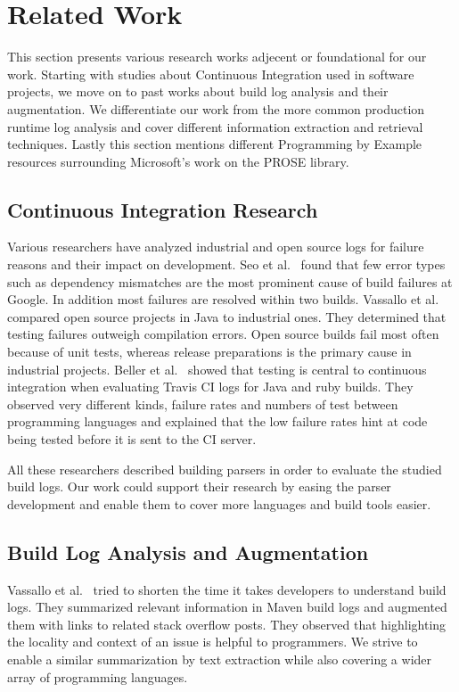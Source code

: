 \documentclass[\myrootdir/main.tex]{subfiles}
\begin{document}
\chapter{Related Work}
This section presents various research works adjecent or foundational for our work. Starting with studies about Continuous Integration used in software projects, we move on to past works about build log analysis and their augmentation. We differentiate our work from the more common production runtime log analysis and cover different information extraction and retrieval techniques. Lastly this section mentions different Programming by Example resources surrounding Microsoft's work on the PROSE library.

\section{Continuous Integration Research}
Various researchers have analyzed industrial and open source logs for failure reasons and their impact on development. Seo et al.~\cite{seo2014programmers} found that few error types such as dependency mismatches are the most prominent cause of build failures at Google. In addition most failures are resolved within two builds. Vassallo et al.~\cite{vassallo2017a-tale} compared open source projects in Java to industrial ones. They determined that testing failures outweigh compilation errors. Open source builds fail most often because of unit tests, whereas release preparations is the primary cause in industrial projects. Beller et al.~\cite{beller2017oops} showed that testing is central to continuous integration when evaluating Travis CI logs for Java and ruby builds. They observed very different kinds, failure rates and numbers of test between programming languages and explained that the low failure rates hint at code being tested before it is sent to the CI server.

All these researchers described building parsers in order to evaluate the studied build logs. Our work could support their research by easing the parser development and enable them to cover more languages and build tools easier.

\section{Build Log Analysis and Augmentation}
Vassallo et al.~\cite{vassallo2018un-break} tried to shorten the time it takes developers to understand build logs. They summarized relevant information in Maven build logs and augmented them with links to related stack overflow posts. They observed that highlighting the locality and context of an issue is helpful to programmers. We strive to enable a similar summarization by text extraction while also covering a wider array of programming languages.
\end{document}
